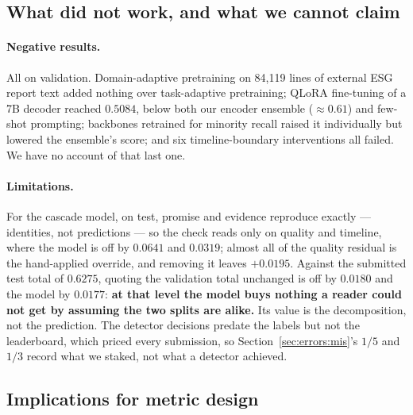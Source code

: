 \subsection{What did not work, and what we cannot claim}
\label{sec:disc:limits}

\paragraph{Negative results.}
All on validation. Domain-adaptive pretraining on 84{,}119 lines of
external ESG report text added nothing over task-adaptive pretraining; QLoRA fine-tuning of a 7B
decoder reached $0.5084$, below both our encoder ensemble ($\approx 0.61$) and few-shot prompting;
backbones retrained for minority recall raised it individually but lowered the ensemble's score; and six timeline-boundary
interventions all failed. We have no account of that last one.

\paragraph{Limitations.}
For the cascade model, on test, promise
and evidence reproduce exactly --- identities, not predictions --- so the check reads only on
quality and timeline, where the model is off by $0.0641$ and $0.0319$; almost all of the quality
residual is the hand-applied override, and removing it leaves $+0.0195$. Against the
submitted test total of $0.6275$, quoting the validation total unchanged is off by $0.0180$ and
the model by $0.0177$:
\textbf{at that level the model buys nothing a reader could not get by assuming the two splits are
alike.} Its value is the decomposition, not the prediction. The detector decisions predate the
labels but not the leaderboard, which priced every submission, so
Section~\ref{sec:errors:mis}'s $1/5$ and $1/3$ record what we staked, not what a detector
achieved.

\subsection{Implications for metric design}
\label{sec:disc:metric}

